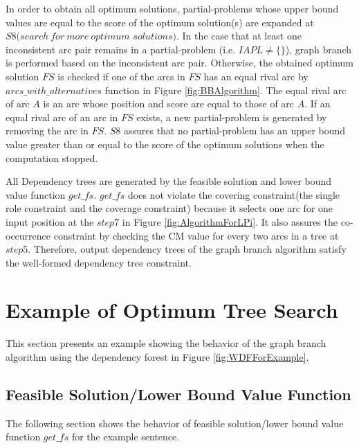 \mygapskip{}


In order to obtain all optimum solutions, partial-problems whose upper
bound values are equal to the score of the optimum solution(s) are
expanded at $S8(search\ for\ more\ optimum$ $solutions)$. In the case that at least
one inconsistent arc pair remains in a partial-problem
(i.e. $IAPL{\ne}\{\}$), graph branch is performed based on the
inconsistent arc pair. Otherwise, the obtained optimum solution $FS$
is checked if one of the arcs in $FS$ has an equal rival arc by
$arcs\_with\_alternatives$ function in Figure \ref{fig:BBAlgorithm}. The
equal rival arc of arc $A$ is an arc whose position and score are equal
to those of arc $A$. If an equal rival arc of an arc in $FS$ exists, 
a new partial-problem is generated by removing the arc in $FS$. $S8$
assures that no partial-problem has an upper bound value greater than or equal
to the score of the optimum solutions when the computation stopped. 

\mygapskip{}

All Dependency trees are generated by the feasible solution and lower
bound value function $get\_fs$. $get\_fs$ does not violate the
covering constraint(the single role constraint and the coverage
constraint) because it selects one arc for one input position at the
$step7$ in Figure \ref{fig:AlgorithmForLPi}. It also assures the
co-occurrence constraint by checking the CM value for every two arcs
in a tree at $step5$. Therefore, output dependency trees of the graph
branch algorithm satisfy the well-formed dependency tree constraint.


\section{Example of Optimum Tree Search}
\label{sec:ExampleOfOptimumTreeSearch}

This section presents an example showing the behavior of the graph
branch algorithm using the dependency forest in
Figure \ref{fig:WDFForExample}.


\subsection{Feasible Solution/Lower Bound Value Function}
The following section shows the behavior of feasible solution/lower bound value function $get\_fs$ for the example sentence.

